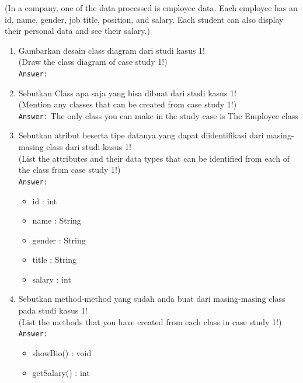 \documentclass[12pt,titlepage]{article}
\begin{document}
(In a company, one of the data processed is employee data. Each employee has an id, name, gender, job title, position, and salary. Each student can also display their personal data and see their salary.)

\begin{enumerate}
    \item Gambarkan desain class diagram dari studi kasus 1! \\ (Draw the class diagram of case study 1!)\\
    \texttt{Answer:} \\
    \item Sebutkan Class apa saja yang bisa dibuat dari studi kasus 1! \\ (Mention any classes that can be created from case study 1!) \\ \texttt{Answer:} The only class you can make in the study case is The Employee class
    \item Sebutkan atribut beserta tipe datanya yang dapat diidentifikasi dari masing-masing class dari studi kasus 1! \\ (List the attributes and their data types that can be identified from each of the class from case study 1!) \\
    \texttt{Answer:} 
    \begin{itemize}
        \item id : int
        \item name : String
        \item gender : String
        \item title : String
        \item salary : int
    \end{itemize}
    \item Sebutkan method-method yang sudah anda buat dari masing-masing class pada studi kasus 1! \\ (List the methods that you have created from each class in case study 1!) \\
    \texttt{Answer:} 
    \begin{itemize}
        \item showBio() : void
        \item getSalary() : int
    \end{itemize}
\end{enumerate}
\end{document}

